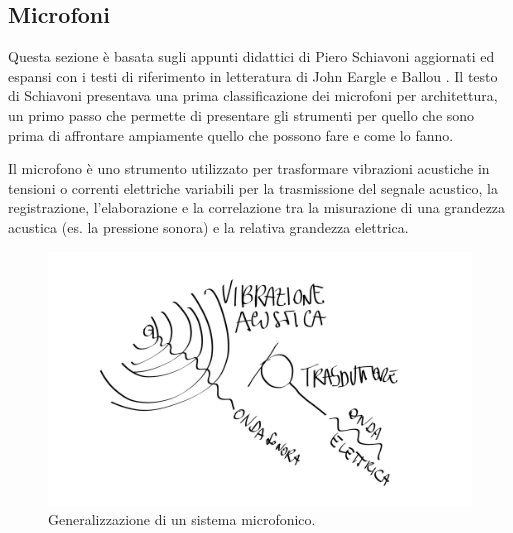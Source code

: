 
\begin{refsection}

\section{Microfoni}
\thispagestyle{empty}

Questa sezione è basata sugli appunti didattici di Piero Schiavoni \autocite{ps:01}
aggiornati ed espansi con i testi di riferimento in letteratura di John Eargle
\autocite{Eargle_2005} e Ballou \autocite{Ballou_2009}. Il testo di Schiavoni
presentava una prima classificazione dei microfoni per architettura, un primo
passo che permette di presentare gli strumenti per quello che sono prima di
affrontare ampiamente quello che possono fare e come lo fanno.

Il microfono è uno strumento utilizzato per trasformare vibrazioni acustiche in
tensioni o correnti elettriche variabili per la trasmissione del segnale acustico,
la registrazione, l'elaborazione e la correlazione tra la
misurazione di una grandezza acustica (es. la pressione sonora) e la relativa
grandezza elettrica.

\begin{figure}[h]
\centering
\includegraphics[width=0.99\columnwidth]{CAPITOLI/0200/img/trasduzione.png}
\caption[]{Generalizzazione di un sistema microfonico.}
\label{mic:condensatore}
\end{figure}


\end{refsection}
